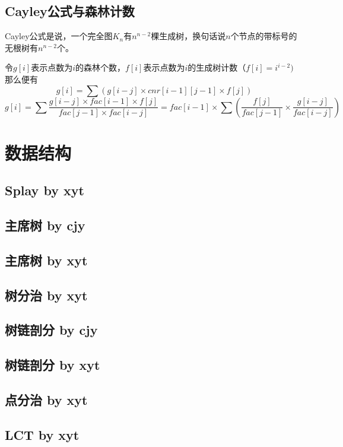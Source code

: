\documentclass[11pt]{article}
\begin{document}
		\subsection{Cayley公式与森林计数}
		Cayley公式是说，一个完全图$K_n$有$n^{n-2}$棵生成树，换句话说$n$个节点的带标号的无根树有$n^{n-2}$个。

令$g[i]$表示点数为$i$的森林个数，$f[i]$表示点数为$i$的生成树计数$（f[i]=i^{i-2})$
那么便有$$g[i]=\sum (g[i-j] \times cnr[i-1][j-1] \times f[j])$$
$$g[i]=\sum \frac{g[i-j] \times fac[i-1] \times f[j]}{fac[j-1] \times fac[i-j]}=fac[i-1] \times \sum (\frac{f[j]}{fac[j-1]} \times \frac{g[i-j]}{fac[i-j]})$$
	
	\section{数据结构}
		\subsection{Splay by xyt}
		
		\subsection{主席树 by cjy}
		
		\subsection{主席树 by xyt}
		
		\subsection{树分治 by xyt}
		
		\subsection{树链剖分 by cjy}
		
		\subsection{树链剖分 by xyt}
		
		\subsection{点分治 by xyt}
		
		\subsection{LCT by xyt}
		
\end{document}
